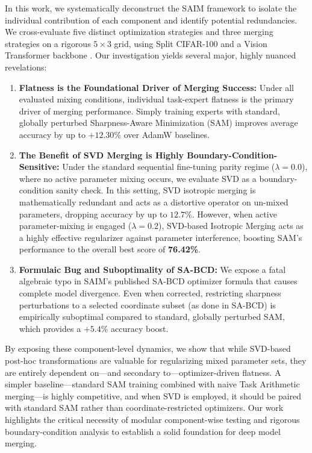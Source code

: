 In this work, we systematically deconstruct the SAIM framework to isolate the individual contribution of each component and identify potential redundancies. We cross-evaluate five distinct optimization strategies and three merging strategies on a rigorous $5 \times 3$ grid, using Split CIFAR-100 \cite{cifar100} and a Vision Transformer backbone \cite{vit}. Our investigation yields several major, highly nuanced revelations:
\begin{enumerate}
  \item \textbf{Flatness is the Foundational Driver of Merging Success:} Under all evaluated mixing conditions, individual task-expert flatness is the primary driver of merging performance. Simply training experts with standard, globally perturbed Sharpness-Aware Minimization (SAM) \cite{sam} improves average accuracy by up to $+12.30\%$ over AdamW baselines.
  \item \textbf{The Benefit of SVD Merging is Highly Boundary-Condition-Sensitive:} Under the standard sequential fine-tuning parity regime ($\lambda = 0.0$), where no active parameter mixing occurs, we evaluate SVD as a boundary-condition sanity check. In this setting, SVD isotropic merging is mathematically redundant and acts as a distortive operator on un-mixed parameters, dropping accuracy by up to $12.7\%$. However, when active parameter-mixing is engaged ($\lambda = 0.2$), SVD-based Isotropic Merging acts as a highly effective regularizer against parameter interference, boosting SAM's performance to the overall best score of \textbf{76.42\%}.
  \item \textbf{Formulaic Bug and Suboptimality of SA-BCD:} We expose a fatal algebraic typo in SAIM's published SA-BCD optimizer formula that causes complete model divergence. Even when corrected, restricting sharpness perturbations to a selected coordinate subset (as done in SA-BCD) is empirically suboptimal compared to standard, globally perturbed SAM, which provides a $+5.4\%$ accuracy boost.
\end{enumerate}

By exposing these component-level dynamics, we show that while SVD-based post-hoc transformations are valuable for regularizing mixed parameter sets, they are entirely dependent on—and secondary to—optimizer-driven flatness. A simpler baseline—standard SAM training combined with naive Task Arithmetic merging—is highly competitive, and when SVD is employed, it should be paired with standard SAM rather than coordinate-restricted optimizers. Our work highlights the critical necessity of modular component-wise testing and rigorous boundary-condition analysis to establish a solid foundation for deep model merging.
